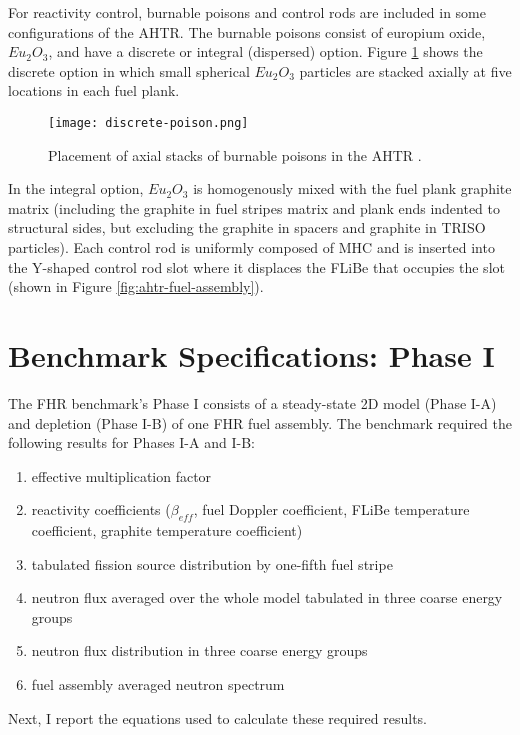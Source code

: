 For reactivity control, burnable poisons and control rods are included in 
some configurations of the \gls{AHTR}. 
The burnable poisons consist of europium oxide, $Eu_2O_3$, and have a discrete
or integral (dispersed) option. 
Figure \ref{fig:discrete-poison} shows the discrete option in which small 
spherical $Eu_2O_3$ particles are stacked axially at five locations in each 
fuel plank. 
\begin{figure}[]
    \centering
    \texttt{[image: discrete-poison.png]} 
    \caption{Placement of axial stacks of burnable poisons in the \acrlong{AHTR} 
    \cite{noauthor_fluoride_nodate}.}
    \label{fig:discrete-poison}
\end{figure}
In the integral option, $Eu_2O_3$ is homogenously mixed with the fuel plank 
graphite matrix (including the graphite in fuel stripes matrix and plank ends 
indented to structural sides, but excluding the graphite in spacers and 
graphite in TRISO particles). 
Each control rod is uniformly composed of \gls{MHC} and is inserted into the 
Y-shaped control rod slot where it displaces the \gls{FLiBe} that occupies the 
slot (shown in Figure \ref{fig:ahtr-fuel-assembly}). 

\section{Benchmark Specifications: Phase I}
\label{sec:phase1}
The \gls{FHR} benchmark's Phase I consists of a steady-state 2D model 
(Phase I-A) and depletion (Phase I-B) of one \gls{FHR} fuel assembly. 
The benchmark required the following results for Phases I-A and I-B:
\begin{enumerate}[label=(\alph*)]
    \item effective multiplication factor 
    \item reactivity coefficients ($\beta_{eff}$, fuel Doppler coefficient, FLiBe 
    temperature coefficient, graphite temperature coefficient)
    \item tabulated fission source distribution by one-fifth fuel stripe
    \item neutron flux averaged over the whole model tabulated in three coarse energy groups
    \item neutron flux distribution in three coarse energy groups
    \item fuel assembly averaged neutron spectrum
\end{enumerate}
Next, I report the equations used to calculate these required results.  


